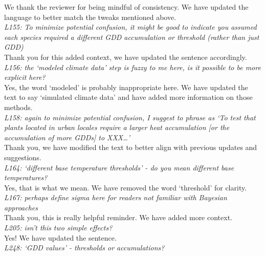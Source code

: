 \documentclass[11pt,a4paper]{article}\usepackage[]{graphicx}\usepackage[]{color}
\begin{document}
We thank the reviewer for being mindful of consistency. We have updated the language to better match the tweaks mentioned above. \\

\textit{L155: To minimize potential confusion, it might be good to indicate you assumed each species required a different GDD accumulation or threshold (rather than just GDD)} \\

Thank you for this added context, we have updated the sentence accordingly. \\

\textit{L156: the `modeled climate data' step is fuzzy to me here, is it possible to be more explicit here?} \\

Yes, the word `modeled' is probably inappropriate here. We have updated the text to say `simulated climate data' and have added more information on those methods. \\

\textit{L158: again to minimize potential confusion, I suggest to phrase as `To test that plants located in urban locales require a larger heat accumulation [or the accumulation of more GDDs] to XXX…'} \\

Thank you, we have modified the text to better align with previous updates and suggestions. \\

\textit{L164: `different base temperature thresholds' - do you mean different base temperatures?} \\

Yes, that is what we mean. We have removed the word `threshold' for clarity. \\

\textit{L167: perhaps define sigma here for readers not familiar with Bayesian approaches} \\

Thank you, this is really helpful reminder. We have added more context. \\

\textit{L205: isn't this two simple effects?} \\

Yes! We have updated the sentence. \\

\textit{L248: `GDD values' - thresholds or accumulations?} \\
\end{document}
